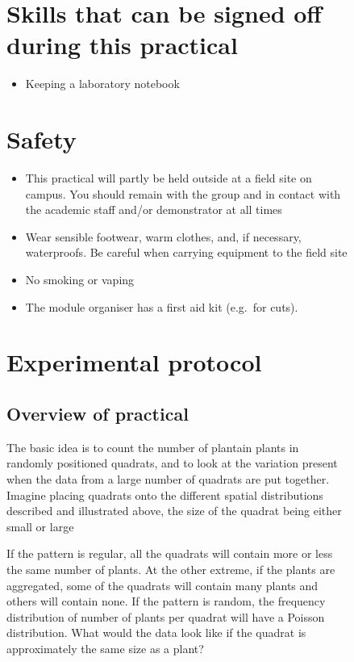 \documentclass[
  letterpaper,
  DIV=11,
  numbers=noendperiod]{scrreprt}
\providecommand{\tightlist}{%
  \setlength{\itemsep}{0pt}\setlength{\parskip}{0pt}}
\begin{document}
\begin{figure}
{\section{Skills that can be signed off during this
practical}\label{skills-that-can-be-signed-off-during-this-practical}

\begin{itemize}
\tightlist
\item
  Keeping a laboratory notebook
\end{itemize}

\section{Safety}\label{safety}

\begin{itemize}
\tightlist
\item
  This practical will partly be held outside at a field site on campus.
  You should remain with the group and in contact with the academic
  staff and/or demonstrator at all times
\item
  Wear sensible footwear, warm clothes, and, if necessary, waterproofs.
  Be careful when carrying equipment to the field site
\item
  No smoking or vaping
\item
  The module organiser has a first aid kit (e.g.~for cuts).
\end{itemize}

\section{Experimental protocol}\label{experimental-protocol}

\subsection{Overview of practical}\label{overview-of-practical}

The basic idea is to count the number of plantain plants in randomly
positioned quadrats, and to look at the variation present when the data
from a large number of quadrats are put together. Imagine placing
quadrats onto the different spatial distributions described and
illustrated above, the size of the quadrat being either small or large

If the pattern is regular, all the quadrats will contain more or less
the same number of plants. At the other extreme, if the plants are
aggregated, some of the quadrats will contain many plants and others
will contain none. If the pattern is random, the frequency distribution
of number of plants per quadrat will have a Poisson distribution. What
would the data look like if the quadrat is approximately the same size
as a plant?

}
\end{figure}
\end{document}
